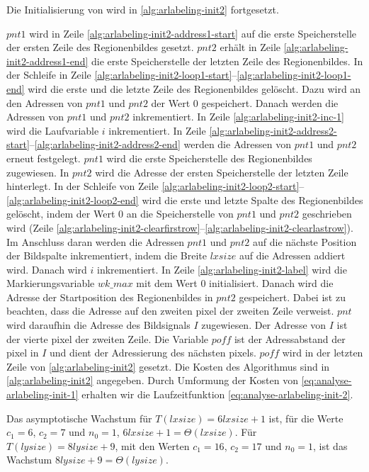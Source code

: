Die Initialisierung von  wird in \autoref{alg:arlabeling-init2} fortgesetzt.

$\mathit{pnt1}$ wird in Zeile \ref{alg:arlabeling-init2-address1-start} auf die erste Speicherstelle der ersten Zeile
 des Regionenbildes gesetzt. $\mathit{pnt2}$ erhält in Zeile \ref{alg:arlabeling-init2-address1-end} die erste
 Speicherstelle der letzten Zeile des Regionenbildes.
In der Schleife in Zeile \ref{alg:arlabeling-init2-loop1-start}--\ref{alg:arlabeling-init2-loop1-end} wird die erste
 und die letzte Zeile des Regionenbildes gelöscht. Dazu wird an den Adressen von
 $\mathit{pnt1}$ und $\mathit{pnt2}$ der Wert $0$ gespeichert. Danach werden die Adressen von $\mathit{pnt1}$ und
 $\mathit{pnt2}$ inkrementiert. In Zeile \ref{alg:arlabeling-init2-inc-1} wird die Laufvariable $i$ inkrementiert. In
 Zeile \ref{alg:arlabeling-init2-address2-start}--\ref{alg:arlabeling-init2-address2-end} werden die Adressen
 von $\mathit{pnt1}$ und $\mathit{pnt2}$ erneut festgelegt. $\mathit{pnt1}$ wird die erste Speicherstelle des
 Regionenbildes zugewiesen. In $\mathit{pnt2}$ wird die Adresse der ersten Speicherstelle der letzten Zeile hinterlegt.
 In der Schleife von Zeile \ref{alg:arlabeling-init2-loop2-start}--\ref{alg:arlabeling-init2-loop2-end} wird die erste
 und letzte Spalte des Regionenbildes gelöscht, indem der Wert $0$ an die Speicherstelle von $\mathit{pnt1}$ und
 $\mathit{pnt2}$ geschrieben wird
 (Zeile \ref{alg:arlabeling-init2-clearfirstrow}--\ref{alg:arlabeling-init2-clearlastrow}). Im Anschluss daran werden
 die Adressen $\mathit{pnt1}$ und $\mathit{pnt2}$ auf die nächste Position der Bildspalte inkrementiert, indem die
 Breite $\mathit{lxsize}$ auf die Adressen addiert wird. Danach wird $i$ inkrementiert. In Zeile
 \ref{alg:arlabeling-init2-label} wird die Markierungsvariable $\mathit{wk\_max}$ mit dem Wert $0$ initialisiert.
 Danach wird die Adresse der Startposition des Regionenbildes in $\mathit{pnt2}$ gespeichert. Dabei ist zu beachten,
 dass die Adresse auf den zweiten \gls{pixel} der zweiten Zeile verweist. $\mathit{pnt}$ wird daraufhin die Adresse des
 Bildsignals $I$ zugewiesen. Der Adresse von $I$ ist der vierte \gls{pixel} der zweiten Zeile. Die Variable
 $\mathit{poff}$ ist der Adressabstand der \gls{pixel} in $I$ und dient der Adressierung des nächsten \glspl{pixel}.
 $\mathit{poff}$ wird in der letzten Zeile von \autoref{alg:arlabeling-init2} gesetzt. Die Kosten des Algorithmus sind
 in \autoref{alg:arlabeling-init2} angegeben. Durch Umformung der Kosten von \autoref{eq:analyse-arlabeling-init-1}
 erhalten wir die Laufzeitfunktion \autoref{eq:analyse-arlabeling-init-2}.

Das asymptotische Wachstum für $T(\mathit{lxsize}) = 6\mathit{lxsize} + 1$ ist, für die Werte $c_{1} = 6$,
 $c_{2} = 7$ und $n_{0} = 1$, $6\mathit{lxsize} + 1 = \Theta(lxsize)$. Für $T(\mathit{lysize}) = 8\mathit{lysize} + 9$,
 mit den Werten $c_{1} = 16$, $c_{2} = 17$ und $n_{0} = 1$, ist das Wachstum $8\mathit{lysize} + 9 = \Theta(lysize)$.

